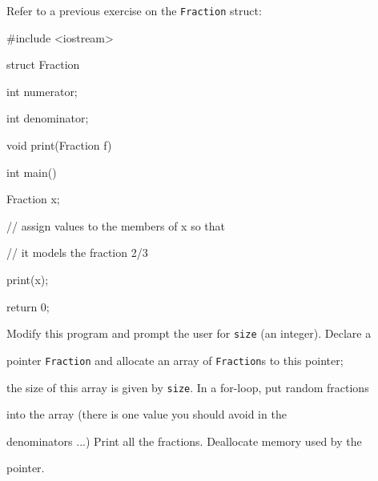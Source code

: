 Refer to a previous exercise on the \texttt{Fraction} struct:



\begin{consolethree}[escapeinside=||]

#include <iostream>



struct Fraction

{

    int numerator;

    int denominator;

}



void print(Fraction f)

{

}



int main()

{

    Fraction x;

    // assign values to the members of x so that

    // it models the fraction 2/3



    print(x);



    return 0;

}

\end{consolethree}



Modify this program and prompt the user for \texttt{size} (an integer). Declare a

pointer \texttt{Fraction} and allocate an array of \texttt{Fraction}s to this pointer;

the size of this array is given by \texttt{size}. In a for-loop, put random fractions

into the array (there is one value you should avoid in the

denominators ...) Print all the fractions. Deallocate memory used by the

pointer.

